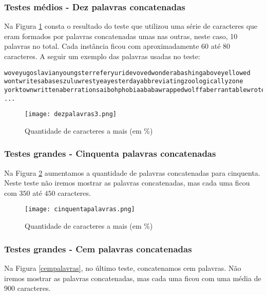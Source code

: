 \documentclass[12pt]{article}
\begin{document}
\subsubsection{Testes médios - Dez palavras concatenadas}
\label{medio10}

Na Figura \ref{dezpalavras} consta o resultado do teste que utilizou uma série de caracteres que eram formados por palavras concatenadas umas nas outras, neste caso, 10 palavras no total. Cada instância ficou com aproximadamente $60$ até $80$ caracteres. A seguir um exemplo das palavras usadas no teste:

\begin{verbatim}
woveyugoslavianyoungsterreferyuridevovedwonderabashingaboveyellowed
wontwritesabaseszuluwrestyeayesterdayabbreviatingzoologicallyzone
yorktownwrittenaberrationsaibohphobiaababawrappedwolffaberrantablewrote
...
\end{verbatim}


    \begin{figure}[h!]
        \centering
        \texttt{[image: dezpalavras3.png]}
        \caption{Quantidade de caracteres a mais (em \%)}
        \label{dezpalavras}
    \end{figure}


\subsubsection{Testes grandes - Cinquenta palavras concatenadas}
\label{grande50}

Na Figura \ref{cinquentapalavras} aumentamos a quantidade de palavras concatenadas para cinquenta. Neste teste não iremos mostrar as palavras concatenadas, mas cada uma ficou com $350$ até $450$ caracteres.

    \begin{figure}[h!]
        \centering
        \texttt{[image: cinquentapalavras.png]}
        \caption{Quantidade de caracteres a mais (em \%)}
        \label{cinquentapalavras}
    \end{figure}

\subsubsection{Testes grandes - Cem palavras concatenadas}
\label{grande100}

Na Figura \ref{cempalavras}, no último teste, concatenamos cem palavras. Não iremos mostrar as palavras concatenadas, mas cada uma ficou com uma média de $900$ caracteres.
\end{document}
